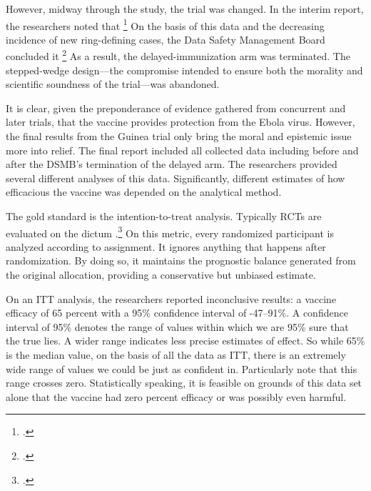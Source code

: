 \documentclass[letterpaper,notitlepage,12pt]{article}
\begin{document}
However, midway through the study, the trial was changed.
In the interim report, 
the researchers noted that \footcite[p. 857]{HR 2015}
On the basis of this data and the decreasing incidence of new ring-defining
cases, the Data Safety Management Board concluded it
\footcite{UF 2015} 
As a result, the delayed-immunization arm was terminated.
The stepped-wedge design---the compromise intended to ensure both the morality
and scientific soundness of the trial---was abandoned.

It is clear, given the preponderance of evidence gathered from
concurrent and later trials, that the vaccine provides protection
from the Ebola virus.
However, the final results from the Guinea trial only bring the moral and
epistemic issue more into relief.
The final report included all collected data including before and after the 
DSMB's termination of the delayed arm.
The researchers provided several different analyses of this data.
Significantly, different estimates of how efficacious the vaccine was depended on
the analytical method.

The gold standard is the intention-to-treat analysis.
Typically RCTs are evaluated on the dictum .\footcite{Heenekens et al 1987}
On this metric, every randomized participant is analyzed according to
assignment.
It ignores anything that happens after randomization.
By doing so, it maintains the prognostic balance generated from the original
allocation, providing a conservative but unbiased estimate.

On an ITT analysis, the researchers reported inconclusive results: a vaccine
efficacy of 65 percent with a 95\% confidence interval of -47--91\%.
A confidence interval of 95\% denotes the range of values within which we are
95\% sure that the true lies.
A wider range indicates less precise estimates of effect.
So while 65\% is the median value, on the basis of all the data as ITT, there 
is an extremely wide range of values we could be just as confident in.
Particularly note that this range crosses zero.
Statistically speaking, it is feasible on grounds of this data set alone that
the vaccine had zero percent efficacy or was possibly even harmful.
\end{document}
